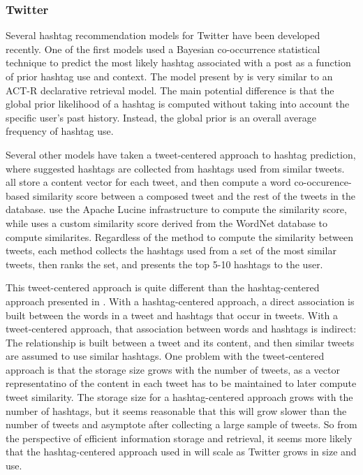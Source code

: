 \documentclass[man,floatsintext]{apa6}
\begin{document}
\subsubsection{Twitter}

Several hashtag recommendation models for Twitter have been developed recently.
One of the first models used a Bayesian co-occurrence statistical technique to predict the most likely hashtag associated with a post as a function of prior hashtag use and context. \parencite{Mazzia2009}
The model present by \textcite{Mazzia2009} is very similar to an ACT-R declarative retrieval model.
The main potential difference is that the global prior likelihood of a hashtag is computed without taking into account the specific user's past history.
Instead, the global prior is an overall average frequency of hashtag use.

Several other models have taken a tweet-centered approach to hashtag prediction, where suggested hashtags are collected from hashtags used from similar tweets.
\textcites{Li2011, Zangerle2011, Kywe2012} all store a content vector for each tweet, and then compute a word co-occurence-based similarity score between a composed tweet and the rest of the tweets in the database.
\textcites{Zangerle2011, Kywe2012} use the Apache Lucine infrastructure to compute the similarity score, while \textcite{Li2011} uses a custom similarity score derived from the WordNet database to compute similarites.
Regardless of the method to compute the similarity between tweets, each method collects the hashtags used from a set of the most similar tweets, then ranks the set, and presents the top 5-10 hashtags to the user.

This tweet-centered approach is quite different than the hashtag-centered approach presented in \textcite{Mazzia2009}.
With a hashtag-centered approach, a direct association is built between the words in a tweet and hashtags that occur in tweets.
With a tweet-centered approach, that association between words and hashtags is indirect:
The relationship is built between a tweet and its content, and then similar tweets are assumed to use similar hashtags.
One problem with the tweet-centered approach is that the storage size grows with the number of tweets, as a vector representatino of the content in each tweet has to be maintained to later compute tweet similarity.
The storage size for a hashtag-centered approach grows with the number of hashtags, but it seems reasonable that this will grow slower than the number of tweets and asymptote after collecting a large sample of tweets.
So from the perspective of efficient information storage and retrieval, it seems more likely that the hashtag-centered approach used in \textcite{Mazzia2009} will scale as Twitter grows in size and use.
\end{document}
